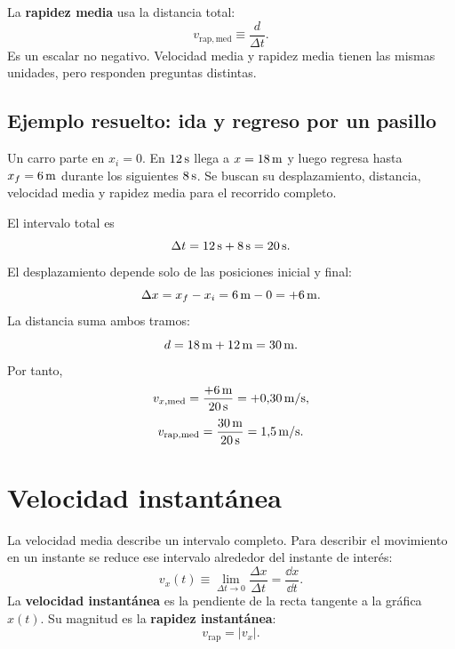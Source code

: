\documentclass[11pt]{article}
\begin{document}
La \textbf{rapidez media} usa la distancia total:
\[
  v_{\mathrm{rap,med}}
  \equiv
  \frac{d}{\Delta t}.
\]
Es un escalar no negativo. Velocidad media y rapidez media tienen las mismas
unidades, pero responden preguntas distintas.

\subsection{Ejemplo resuelto: ida y regreso por un pasillo}

Un carro parte en \(x_i=0\). En \(12\,\mathrm{s}\) llega a
\(x=18\,\mathrm{m}\) y luego regresa hasta \(x_f=6\,\mathrm{m}\) durante los
siguientes \(8\,\mathrm{s}\). Se buscan su desplazamiento, distancia,
velocidad media y rapidez media para el recorrido completo.

El intervalo total es
\[
  \Delta t=12\,\mathrm{s}+8\,\mathrm{s}=20\,\mathrm{s}.
\]
El desplazamiento depende solo de las posiciones inicial y final:
\[
  \Delta x=x_f-x_i
  =6\,\mathrm{m}-0
  =+6\,\mathrm{m}.
\]
La distancia suma ambos tramos:
\[
  d=18\,\mathrm{m}+12\,\mathrm{m}
  =30\,\mathrm{m}.
\]
Por tanto,
\[
  v_{x,\mathrm{med}}
  =
  \frac{+6\,\mathrm{m}}{20\,\mathrm{s}}
  =
  +0{,}30\,\mathrm{m/s},
\]
\[
  v_{\mathrm{rap,med}}
  =
  \frac{30\,\mathrm{m}}{20\,\mathrm{s}}
  =
  1{,}5\,\mathrm{m/s}.
\]



\section{Velocidad instantánea}

La velocidad media describe un intervalo completo. Para describir el
movimiento en un instante se reduce ese intervalo alrededor del instante de
interés:
\[
  v_x(t)
  \equiv
  \lim_{\Delta t\to0}
  \frac{\Delta x}{\Delta t}
  =
  \frac{\dd x}{\dd t}.
\]
La \textbf{velocidad instantánea} es la pendiente de la recta tangente a la
gráfica \(x(t)\). Su magnitud es la \textbf{rapidez instantánea}:
\[
  v_{\mathrm{rap}}=|v_x|.
\]

\begin{center}
\end{center}
\end{document}
